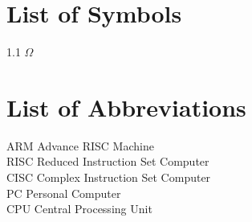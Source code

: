\listoffigures
\newpage\cleardoublepage

\listoftables

\chapter*{List of Symbols}
\label{listSym}
1.1 $\Omega$ 

\newpage\cleardoublepage

\chapter*{List of Abbreviations}
\label{listAbr}
ARM \Dotfill Advance RISC Machine
\\
RISC \Dotfill Reduced Instruction Set Computer 
\\
CISC \Dotfill Complex Instruction Set Computer 
\\
PC \Dotfill Personal Computer
\\
CPU \Dotfill Central Processing Unit
 

\newpage\cleardoublepage